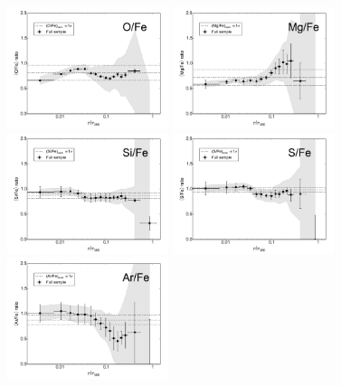 \documentclass{aa}
\begin{document}
\begin{figure}[!]
        \centering
                \includegraphics[width=0.42\textwidth]{fig_radial_stacked_O_normFe.pdf}
                \includegraphics[width=0.42\textwidth]{fig_radial_stacked_Mg_normFe.pdf}
\\
                \includegraphics[width=0.42\textwidth]{fig_radial_stacked_Si_normFe.pdf}
                \includegraphics[width=0.42\textwidth]{fig_radial_stacked_S_normFe.pdf}
\\
                \includegraphics[width=0.42\textwidth]{fig_radial_stacked_Ar_normFe.pdf}

\end{figure}
\end{document}
